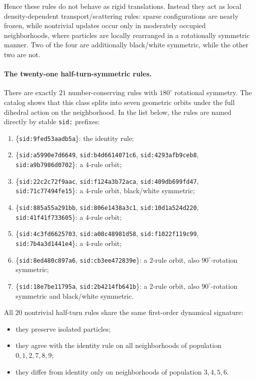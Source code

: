 \documentclass[11pt,a4paper]{article}
\newcommand{\sid}[1]{\texttt{sid:}\allowbreak\texttt{#1}}
\begin{document}
Hence these rules do not behave as rigid translations.  Instead they act as local
density-dependent transport/scattering rules: sparse configurations are nearly frozen, while
nontrivial updates occur only in moderately occupied neighborhoods, where particles are locally
rearranged in a rotationally symmetric manner.  Two of the four are additionally
black/white symmetric, while the other two are not.

\paragraph{The twenty-one half-turn-symmetric rules.}
There are exactly \(21\) number-conserving rules with \(180^\circ\) rotational symmetry.  The
catalog shows that this class splits into seven geometric orbits under the full dihedral action
on the neighborhood.  In the list below, the rules are named directly by stable \sid{}
prefixes:
\begin{enumerate}
\item \{\sid{9fed53aadb5a}\}: the identity rule;
\item \{\sid{a5990e7d6649}, \sid{b4d6614071c6},
      \sid{4293afb9ceb8}, \sid{a9b7986d0702}\}: a \(4\)-rule orbit;
\item \{\sid{22c2c72f9aac}, \sid{f124a3b72aca},
      \sid{409db699fd47}, \sid{71c77494fe15}\}: a \(4\)-rule orbit,
      black/white symmetric;
\item \{\sid{885a55a291bb}, \sid{806e1438a3c1},
      \sid{10d1a524d220}, \sid{41f41f733605}\}: a \(4\)-rule orbit;
\item \{\sid{4c3fd6625703}, \sid{a08c48981d58},
      \sid{f1022f119c99}, \sid{7b4a3d1441e4}\}: a \(4\)-rule orbit;
\item \{\sid{8ed480c897a6}, \sid{cb3ee472839e}\}: a \(2\)-rule orbit, also
      \(90^\circ\)-rotation symmetric;
\item \{\sid{18e7be11795a}, \sid{2b4214fb641b}\}: a \(2\)-rule orbit, also
      \(90^\circ\)-rotation symmetric and
      black/white symmetric.
\end{enumerate}

All \(20\) nontrivial half-turn rules share the same first-order dynamical signature:
\begin{itemize}
\item they preserve isolated particles;
\item they agree with the identity rule on all neighborhoods of population
      \(0,1,2,7,8,9\);
\item they differ from identity only on neighborhoods of population \(3,4,5,6\).
\end{itemize}
\end{document}
